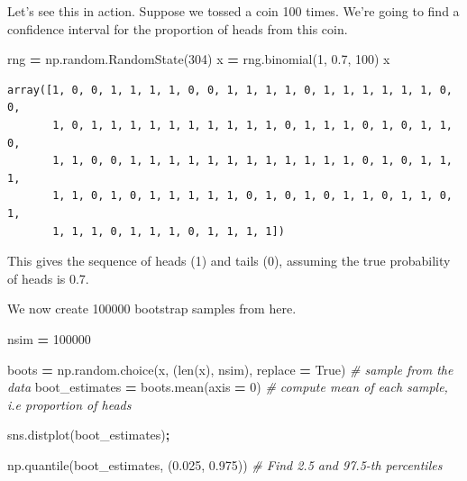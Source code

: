\documentclass[
  letterpaper,
]{scrbook}
\newenvironment{Shaded}{\begin{snugshade}}{\end{snugshade}}
\newcommand{\BuiltInTok}[1]{#1}
\newcommand{\CommentTok}[1]{\textcolor[rgb]{0.56,0.35,0.01}{\textit{#1}}}
\newcommand{\DecValTok}[1]{\textcolor[rgb]{0.00,0.00,0.81}{#1}}
\newcommand{\FloatTok}[1]{\textcolor[rgb]{0.00,0.00,0.81}{#1}}
\newcommand{\NormalTok}[1]{#1}
\newcommand{\OperatorTok}[1]{\textcolor[rgb]{0.81,0.36,0.00}{\textbf{#1}}}
\newcommand{\VariableTok}[1]{\textcolor[rgb]{0.00,0.00,0.00}{#1}}
\begin{document}
Let's see this in action. Suppose we tossed a coin 100 times. We're going to find a confidence interval for the proportion of heads from this coin.

\begin{Shaded}
\begin{Highlighting}[]
\NormalTok{rng }\OperatorTok{=}\NormalTok{ np.random.RandomState(}\DecValTok{304}\NormalTok{)}
\NormalTok{x }\OperatorTok{=}\NormalTok{ rng.binomial(}\DecValTok{1}\NormalTok{, }\FloatTok{0.7}\NormalTok{, }\DecValTok{100}\NormalTok{)}
\NormalTok{x}
\end{Highlighting}
\end{Shaded}

\begin{verbatim}
array([1, 0, 0, 1, 1, 1, 1, 0, 0, 1, 1, 1, 1, 0, 1, 1, 1, 1, 1, 1, 0, 0,
       1, 0, 1, 1, 1, 1, 1, 1, 1, 1, 1, 1, 0, 1, 1, 1, 0, 1, 0, 1, 1, 0,
       1, 1, 0, 0, 1, 1, 1, 1, 1, 1, 1, 1, 1, 1, 1, 1, 0, 1, 0, 1, 1, 1,
       1, 1, 0, 1, 0, 1, 1, 1, 1, 1, 0, 1, 0, 1, 0, 1, 1, 0, 1, 1, 0, 1,
       1, 1, 1, 0, 1, 1, 1, 0, 1, 1, 1, 1])
\end{verbatim}

This gives the sequence of heads (1) and tails (0), assuming the true probability of heads is 0.7.

We now create 100000 bootstrap samples from here.

\begin{Shaded}
\begin{Highlighting}[]
\NormalTok{nsim }\OperatorTok{=} \DecValTok{100000}

\NormalTok{boots }\OperatorTok{=}\NormalTok{ np.random.choice(x, (}\BuiltInTok{len}\NormalTok{(x), nsim), replace }\OperatorTok{=} \VariableTok{True}\NormalTok{) }\CommentTok{# sample from the data}
\NormalTok{boot_estimates }\OperatorTok{=}\NormalTok{ boots.mean(axis }\OperatorTok{=} \DecValTok{0}\NormalTok{) }\CommentTok{# compute mean of each sample, i.e proportion of heads}

\NormalTok{sns.distplot(boot_estimates)}\OperatorTok{;}
\end{Highlighting}
\end{Shaded}

\begin{Shaded}
\begin{Highlighting}[]
\NormalTok{np.quantile(boot_estimates, (}\FloatTok{0.025}\NormalTok{, }\FloatTok{0.975}\NormalTok{)) }\CommentTok{# Find 2.5 and 97.5-th percentiles}
\end{Highlighting}
\end{Shaded}
\end{document}

